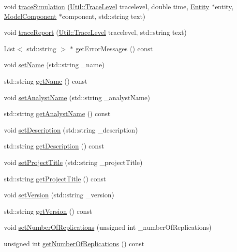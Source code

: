 \begin{DoxyCompactItemize}
\item 
void \hyperlink{class_model_a0d866e0ef942638d63c1d8c3eb98fa19}{trace\-Simulation} (\hyperlink{class_util_a604561d00f5999b5ca280401140e58d9}{Util\-::\-Trace\-Level} tracelevel, double time, \hyperlink{class_entity}{Entity} $\ast$entity, \hyperlink{class_model_component}{Model\-Component} $\ast$component, std\-::string text)
\item 
void \hyperlink{class_model_ab601f70b29eed01e6a495924c852caf0}{trace\-Report} (\hyperlink{class_util_a604561d00f5999b5ca280401140e58d9}{Util\-::\-Trace\-Level} tracelevel, std\-::string text)
\item 
\hyperlink{class_list}{List}$<$ std\-::string $>$ $\ast$ \hyperlink{class_model_ae0d77f48384e180cfabb8fd8ed16e4db}{get\-Error\-Messages} () const 
\item 
void \hyperlink{class_model_a2aab01a2871b2924eeb3c265267fabef}{set\-Name} (std\-::string \-\_\-name)
\item 
std\-::string \hyperlink{class_model_a1a1c7e795ee409d8e61c942db5f94d17}{get\-Name} () const 
\item 
void \hyperlink{class_model_a52c044c61c8411b083006d2c5fbe0abf}{set\-Analyst\-Name} (std\-::string \-\_\-analyst\-Name)
\item 
std\-::string \hyperlink{class_model_a9b539226cc78c36bfe911252e9ccd055}{get\-Analyst\-Name} () const 
\item 
void \hyperlink{class_model_a84eb0333d18ac7f8a684d1cd32c64dbd}{set\-Description} (std\-::string \-\_\-description)
\item 
std\-::string \hyperlink{class_model_a40ad9af9a5cebe907d483fb51d0f4974}{get\-Description} () const 
\item 
void \hyperlink{class_model_a97ce94d618caee4364e82a8790f00052}{set\-Project\-Title} (std\-::string \-\_\-project\-Title)
\item 
std\-::string \hyperlink{class_model_ae2197c7da38542ec199491c3d5797efd}{get\-Project\-Title} () const 
\item 
void \hyperlink{class_model_a630f152feb166751ecf53e5c628a7826}{set\-Version} (std\-::string \-\_\-version)
\item 
std\-::string \hyperlink{class_model_a073ecbf56dfd06e46af31bbd67a0402d}{get\-Version} () const 
\item 
void \hyperlink{class_model_a55d597e867b5c3e27cb2e1511414e7f3}{set\-Number\-Of\-Replications} (unsigned int \-\_\-number\-Of\-Replications)
\item 
unsigned int \hyperlink{class_model_af2fe357b860298f4977f8f48cee7115a}{get\-Number\-Of\-Replications} () const 

\end{DoxyCompactItemize}
